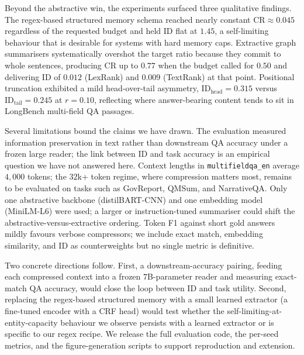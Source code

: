 \documentclass[11pt]{article}
\begin{document}
Beyond the abstractive win, the experiments surfaced three
qualitative findings. The regex-based structured memory schema
reached nearly constant $\mathrm{CR} \approx 0.045$ regardless of the
requested budget and held $\mathrm{ID}$ flat at $1.45$, a
self-limiting behaviour that is desirable for systems with hard
memory caps. Extractive graph summarisers systematically overshot the
target ratio because they commit to whole sentences, producing
$\mathrm{CR}$ up to $0.77$ when the budget called for $0.50$ and
delivering $\mathrm{ID}$ of $0.012$ (LexRank) and $0.009$ (TextRank) at that point. Positional
truncation exhibited a mild head-over-tail asymmetry,
$\mathrm{ID}_{\mathrm{head}} = 0.315$ versus
$\mathrm{ID}_{\mathrm{tail}} = 0.245$ at $r = 0.10$, reflecting where
answer-bearing content tends to sit in LongBench multi-field QA
passages.

Several limitations bound the claims we have drawn. The evaluation
measured information preservation in text rather than downstream QA
accuracy under a frozen large reader; the link between ID and task
accuracy is an empirical question we have not answered here. Context
lengths in \texttt{multifieldqa\_en} average $4{,}000$ tokens; the
$32$k+ token regime, where compression matters most, remains to be
evaluated on tasks such as GovReport, QMSum, and NarrativeQA. Only one
abstractive backbone (distilBART-CNN) and one embedding model
(MiniLM-L6) were used; a larger or instruction-tuned summariser could
shift the abstractive-versus-extractive ordering. Token F1 against
short gold answers mildly favours verbose compressors; we include
exact match, embedding similarity, and $\mathrm{ID}$ as counterweights
but no single metric is definitive.

Two concrete directions follow. First, a downstream-accuracy pairing,
feeding each compressed context into a frozen $7$B-parameter reader and
measuring exact-match QA accuracy, would close the loop between ID and
task utility. Second, replacing the regex-based structured memory with
a small learned extractor (a fine-tuned encoder with a CRF head) would
test whether the self-limiting-at-entity-capacity behaviour we observe
persists with a learned extractor or is specific to our regex recipe.
We release the full evaluation code, the per-seed metrics, and the
figure-generation scripts to support reproduction and extension.

\FloatBarrier
\balance


\end{document}

